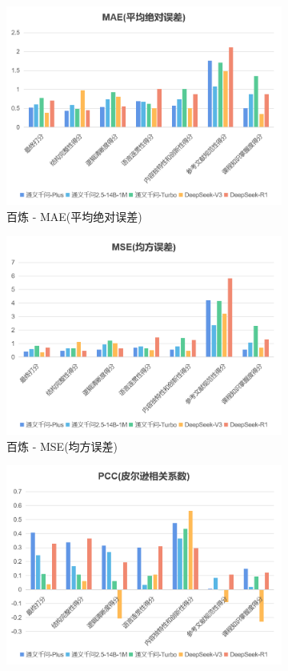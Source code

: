 \documentclass{article}
\begin{document}
\begin{figure}[h!]
	\centering
	\begin{subfigure}{0.3\linewidth}
		\centering
		\includegraphics[width=0.9\linewidth]{img/bailian-MAE.png}
		\caption{百炼 - MAE(平均绝对误差)}
		\label{fig:bailian-MAE}
	\end{subfigure}
	\centering
	\begin{subfigure}{0.3\linewidth}
		\centering
		\includegraphics[width=0.9\linewidth]{img/bailian-MSE.png}
		\caption{百炼 - MSE(均方误差)}
		\label{fig:bailian-MSE}
	\end{subfigure}
    \centering
	\begin{subfigure}{0.3\linewidth}
		\centering
		\includegraphics[width=0.9\linewidth]{img/bailian-PCC.png}

\end{subfigure}
\end{figure}
\end{document}
